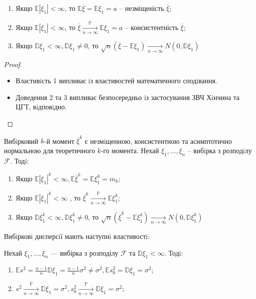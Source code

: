 \begin{enumerate}
	\item Якщо $\mathbb{E} |\xi_1| < \infty $, то $\mathbb{E} \overline{\xi} = \mathbb{E} \xi_1 = a$ -- незміщеність $\overline{\xi}$;
	\item Якщо $\mathbb{E} |\xi_1| < \infty $, то $\overline{\xi} \xrightarrow[n\to\infty]{\mathbb{P}} \mathbb{E} \xi_1 = a$ -- консистентність $\overline{\xi}$;
	\item Якщо $\mathbb{D} \xi_1 < \infty, \mathbb{D} \xi_1 \neq 0$, то $\sqrt{n} (\overline{\xi} - \mathbb{E} \xi_1) \xrightarrow[n\to\infty]{} N(0, \mathbb{D} \xi_1)$
\end{enumerate}
\begin{proof}\ \\
 \begin{itemize}
 	\item Властивiсть 1 випливає iз властивостей математичного сподiвання.\\
	\item Доведення 2 та 3 випливає безпосередньо iз застосування ЗВЧ Хiнчина та ЦГТ,
вiдповiдно.
 \end{itemize}
\end{proof}
\newpage
Вибiрковий $k$-й момент $\overline{\xi}^k$  є незмiщенною, консистентною та асимптотично нормальною для
теоретичного $k$-го момента.
Нехай $\xi_1 , \dots, \xi_n$ – вибiрка з розподiлу $\mathcal{F}$. Тодi:
\begin{enumerate}
	\item Якщо $\mathbb{E} |\xi_1|^k < \infty , \mathbb{E} \overline{\xi}^k = \mathbb{E} \xi_1^k = m_k ;$
	\item  Якщо $\mathbb{E} |\xi_1|^k < \infty$ , то $ \overline{\xi}^k \xrightarrow[n\to\infty]{\mathbb{P}} \mathbb{E} \xi_1^k;$
	\item Якщо $\mathbb{D}\xi_1^k < \infty , \mathbb{D} \xi_1^k \neq 0$, то $\sqrt{n} (\overline{\xi}^k - \mathbb{E} \xi_1^k) \xrightarrow[n\to\infty]{} N(0, \mathbb{D} \xi_1^k)$
\end{enumerate}
Вибiрковi дисперсiї мають наступнi властивостi:\par
Нехай $\xi_1 , \dots , \xi_n$ --- вибірка з розподілу $\mathcal{F}$ та $\mathbb{D} \xi_1 < \infty$. Тодi:
\begin{enumerate}
	\item $\mathbb{E} s^2 = \frac{n-1}{n} \mathbb{D}\xi_1 = \frac{n-1}{n}\sigma^2 \neq \sigma^2 , \mathbb{E}s^2_0 = \mathbb{D} \xi_1 = \sigma^2  $;
	\item $s^2 \xrightarrow[n\to\infty]{\mathbb{P}} \mathbb{D} \xi_1 = \sigma^2 , s^2_0 \xrightarrow[n\to\infty]{\mathbb{P}} \mathbb{D}\xi_1 = \sigma^2 $;

\end{enumerate}
\newpage
